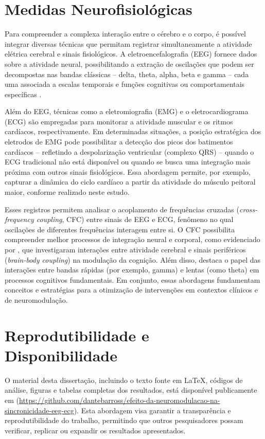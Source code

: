 \section{Medidas Neurofisiológicas}
Para compreender a complexa interação entre o cérebro e o corpo, é possível integrar diversas técnicas que permitam registrar simultaneamente a atividade elétrica cerebral e sinais fisiológicos. A eletroencefalografia (EEG) fornece dados sobre a atividade neural, possibilitando a extração de oscilações que podem ser decompostas nas bandas clássicas – delta, theta, alpha, beta e gamma – cada uma associada a escalas temporais e funções cognitivas ou comportamentais específicas \cite{cohen2017where, bullmore2009complex}.

Além do EEG, técnicas como a eletromiografia (EMG) e o eletrocardiograma (ECG) são empregadas para monitorar a atividade muscular e os ritmos cardíacos, respectivamente. Em determinadas situações, a posição estratégica dos eletrodos de EMG pode possibilitar a detecção dos picos dos batimentos cardíacos – refletindo a despolarização ventricular (complexo QRS) – quando o ECG tradicional não está disponível ou quando se busca uma integração mais próxima com outros sinais fisiológicos. Essa abordagem permite, por exemplo, capturar a dinâmica do ciclo cardíaco a partir da atividade do músculo peitoral maior, conforme realizado neste estudo.

Esses registros permitem analisar o acoplamento de frequências cruzadas (\textit{cross-frequency coupling}, CFC) entre sinais de EEG e ECG, fenômeno no qual oscilações de diferentes frequências interagem entre si. O CFC possibilita compreender melhor processos de integração neural e corporal, como evidenciado por , que investigaram interações entre atividade cerebral e sinais periféricos (\textit{brain-body coupling}) na modulação da cognição. Além disso,  destaca o papel das interações entre bandas rápidas (por exemplo, gamma) e lentas (como theta) em processos cognitivos fundamentais. Em conjunto, essas abordagens fundamentam conceitos e estratégias para a otimização de intervenções em contextos clínicos e de neuromodulação.

\section{Reprodutibilidade e Disponibilidade}
O material desta dissertação, incluindo o texto fonte em \LaTeX, códigos de análise, figuras e tabelas completas dos resultados, está disponível publicamente em \cite{barros2025repository} (\url{https://github.com/dantebarross/efeito-da-neuromodulacao-na-sincronicidade-eeg-ecg}). Esta abordagem visa garantir a transparência e reprodutibilidade do trabalho, permitindo que outros pesquisadores possam verificar, replicar ou expandir os resultados apresentados.